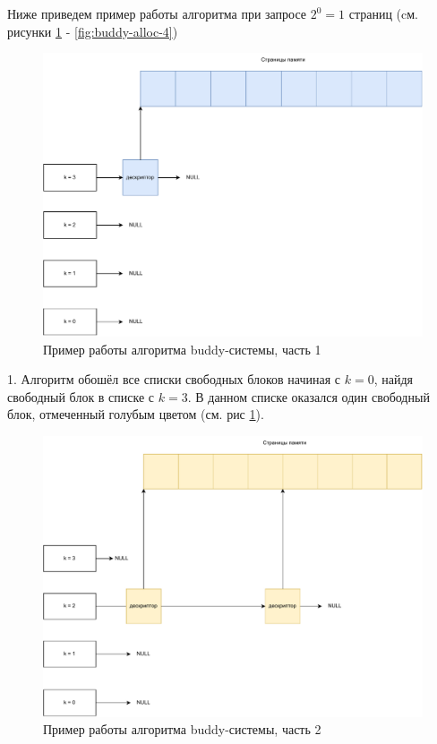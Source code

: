 Ниже приведем пример работы алгоритма при запросе $2^0 = 1$ страниц (cм. рисунки \ref{fig:buddy-alloc-1} - \ref{fig:buddy-alloc-4})

\begin{figure}[h]
	\centering
	\includegraphics[width=\textwidth]{img/buddy-allocator-1.pdf}
	\caption{Пример работы алгоритма buddy-системы, часть 1}
	\label{fig:buddy-alloc-1}
\end{figure}

1. Алгоритм обошёл все списки свободных блоков начиная с $k = 0$, найдя свободный блок в списке с $k = 3$. В данном списке оказался один свободный блок, отмеченный голубым цветом (см. рис \ref{fig:buddy-alloc-1}).

\begin{figure}[h]
	\centering
	\includegraphics[width=\textwidth]{img/buddy-allocator-2.pdf}
	\caption{Пример работы алгоритма buddy-системы, часть 2}
	\label{fig:buddy-alloc-2}
\end{figure}

